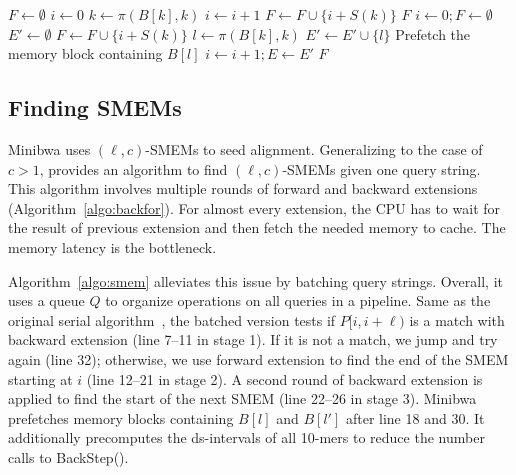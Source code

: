 \documentclass[webpdf,contemporary,large,namedate]{oup-authoring-template}%
\begin{document}
\begin{algorithm}[bt]
	\caption{Retrieve chromosomal positions}\label{algo:sa}
	\begin{algorithmic}[1]
			\State $F\gets\emptyset$
				\State $i\gets0$
					\State $k\gets\pi(B[k],k)$
					\State $i\gets i+1$
				\EndWhile
				\State $F\gets F\cup\{i+S(k)\}$
			\EndFor
			\State \Return $F$
		\EndFunction
			\State $i\gets0; F\gets\emptyset$
				\State $E'\gets\emptyset$
						\State $F\gets F\cup\{i+S(k)\}$
					\Else
						\State $l\gets\pi(B[k],k)$
						\State $E'\gets E'\cup\{l\}$
						\State Prefetch the memory block containing $B[l]$
					\EndIf
				\EndFor
				\State $i\gets i+1; E\gets E'$
			\EndWhile
			\State \Return $F$
		\EndFunction
	\end{algorithmic}
\end{algorithm}

\subsection{Finding SMEMs}\label{sec:smem}

Minibwa uses $(\ell,c)$-SMEMs to seed alignment.
Generalizing \citet{DBLP:conf/dlt/Gagie24} to the case of $c>1$,
\citet{Li:2024ac} provides an algorithm to find $(\ell,c)$-SMEMs given one query string.
This algorithm involves multiple rounds of forward and backward extensions (Algorithm~\ref{algo:backfor}).
For almost every extension, the CPU has to wait for the result of previous extension and then fetch the needed memory to cache.
The memory latency is the bottleneck.

Algorithm~\ref{algo:smem} alleviates this issue by batching query strings.
Overall, it uses a queue $Q$ to organize operations on all queries in a pipeline.
Same as the original serial algorithm~\citep{Li:2024ac},
the batched version tests if $P[i,i+\ell)$ is a match with backward extension (line 7--11 in stage 1).
If it is not a match, we jump and try again (line 32);
otherwise, we use forward extension to find the end of the SMEM starting at $i$ (line 12--21 in stage 2).
A second round of backward extension is applied to find the start of the next SMEM (line 22--26 in stage 3).
Minibwa prefetches memory blocks containing $B[l]$ and $B[l']$ after line 18 and 30.
It additionally precomputes the ds-intervals of all 10-mers to reduce the number calls to {\sc BackStep}().
\end{document}
